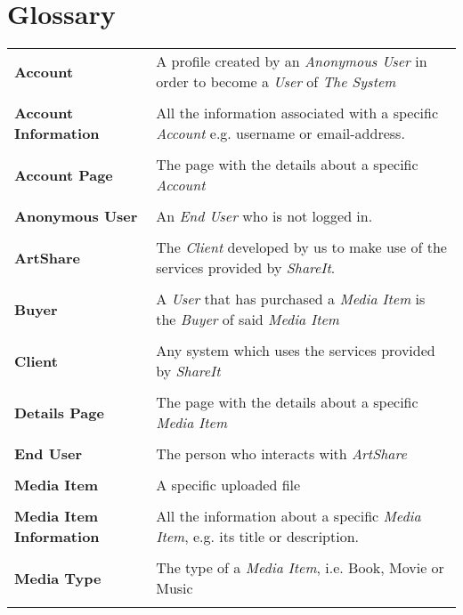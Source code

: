 \documentclass[../report.tex]{subfiles}
\begin{document}
\section{Glossary}
\begin{longtable}{l p{10 cm}}
\textbf{Account} & A profile created by an \textit{Anonymous User} in order to become a \textit{User} of \textit{The System} \\ \\
\textbf{Account Information} & All the information associated with a specific \textit{Account} e.g. username or email-address.\\ \\
\textbf{Account Page} & The page with the details about a specific \textit{Account} \\ \\
\textbf{Anonymous User} & An \textit{End User} who is not logged in.\\ \\
\textbf{ArtShare} & The \textit{Client} developed by us to make use of the services provided by \textit{ShareIt}. \\ \\
\textbf{Buyer} & A \textit{User} that has purchased a \textit{Media Item} is the \textit{Buyer} of said \textit{Media Item} \\ \\
\textbf{Client} & Any system which uses the services provided by \textit{ShareIt} \\ \\
\textbf{Details Page} & The page with the details about a specific \textit{Media Item} \\ \\
\textbf{End User} & The person who interacts with \textit{ArtShare} \\ \\
\textbf{Media Item} & A specific uploaded file \\ \\
\textbf{Media Item Information} & All the information  about a specific \textit{Media Item}, e.g. its title or description. \\ \\
\textbf{Media Type} & The type of a \textit{Media Item}, i.e. Book, Movie or Music \\ \\

\end{longtable}
\end{document}
